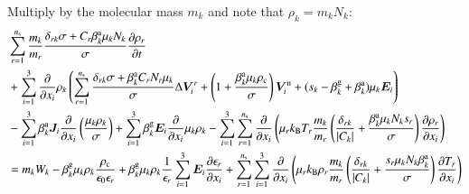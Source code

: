 \documentclass{warpdoc}
\newcommand{\alb}{\vspace{0.1cm}\\} %
\newcommand{\ns}{{n_{\rm s}}}
\renewcommand{\vec}[1]{\bm{#1}}
\begin{document}
%
Multiply by the molecular mass $m_k$ and note that $\rho_k=m_k N_k$:
%
\begin{align}
  &\sum_{r=1}^{\ns} \frac{m_k}{m_r}\frac{\delta_{rk}\sigma+C_r  \beta_k^{\rm a} \mu_k N_k}{\sigma} \frac{\partial \rho_r}{\partial t}  \nonumber\alb
  &+ \sum_{i=1}^3 \frac{\partial}{\partial x_i}  \rho_k \left(  \sum_{r=1}^\ns \frac{\delta_{rk}\sigma+ \beta^{\rm a}_k C_r N_r \mu_k}{\sigma}   \Delta \vec{V}_i^r + \left(1+\frac{\beta^{\rm a}_k \mu_k \rho_{\rm c}}{\sigma}\right)\vec{V}^{\rm n}_i + (s_k-\beta_k^{\rm g}+ \beta^{\rm a}_k) \mu_k  \vec{E}_i    \right) 
\nonumber \\
&- \sum_{i=1}^3 \beta_k^{\rm a}\vec{J}_i \frac{\partial}{\partial x_i}  \left( \frac{\mu_k \rho_k}{\sigma} 
\right) 
+ \sum_{i=1}^3 \beta_k^{\rm g} \vec{E}_i \frac{\partial }{\partial x_i} \mu_{k} \rho_{k}
- \sum_{i=1}^3 \sum_{r=1}^{\ns} \frac{\partial}{\partial x_i} \left(\mu_r k_{\rm B} T_r\frac{m_k}{m_r}\left(\frac{ \delta_{rk} }{ |C_k|}+   \frac{ \beta_k^{\rm a}\mu_k N_k s_r}{\sigma}\right)  \frac{\partial \rho_r}{\partial x_i}\right) 
\nonumber \\
&= m_k W_k
-\beta_k^{\rm g} \mu_{k} \rho_{k}\frac{\rho_{\rm c}}{\epsilon_0 \epsilon_r}  
+\beta_k^{\rm g} \mu_{k} \rho_{k}\frac{1}{\epsilon_r} \sum_{i=1}^3 \vec{E}_i \frac{\partial \epsilon_r}{\partial x_i}  
+ \sum_{r=1}^\ns \sum_{i=1}^3  \frac{\partial}{\partial x_i} \left( \mu_r k_{\rm B} \rho_r  \frac{m_k}{m_r} \left(\frac{\delta_{rk}}{|C_k|}+\frac{s_r \mu_k N_k \beta_k^{\rm a}}{\sigma}\right)  \frac{\partial T_r}{\partial x_i} \right)
\end{align}
%
\end{document}
